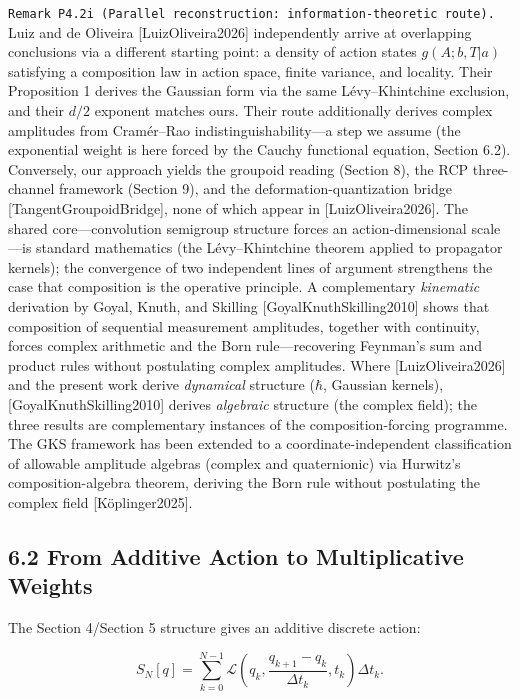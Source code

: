 \documentclass[
]{article}
\begin{document}
\texttt{Remark\ P4.2i\ (Parallel\ reconstruction:\ information-theoretic\ route).}
Luiz and de Oliveira {[}LuizOliveira2026{]} independently arrive at
overlapping conclusions via a different starting point: a density of
action states \(g(A;b,T|a)\) satisfying a composition law in action
space, finite variance, and locality. Their Proposition 1 derives the
Gaussian form via the same Lévy--Khintchine exclusion, and their \(d/2\)
exponent matches ours. Their route additionally derives complex
amplitudes from Cramér--Rao indistinguishability---a step we assume (the
exponential weight is here forced by the Cauchy functional equation,
Section 6.2). Conversely, our approach yields the groupoid reading
(Section 8), the RCP three-channel framework (Section 9), and the
deformation-quantization bridge {[}TangentGroupoidBridge{]}, none of
which appear in {[}LuizOliveira2026{]}. The shared core---convolution
semigroup structure forces an action-dimensional scale---is standard
mathematics (the Lévy--Khintchine theorem applied to propagator
kernels); the convergence of two independent lines of argument
strengthens the case that composition is the operative principle. A
complementary \emph{kinematic} derivation by Goyal, Knuth, and Skilling
{[}GoyalKnuthSkilling2010{]} shows that composition of sequential
measurement amplitudes, together with continuity, forces complex
arithmetic and the Born rule---recovering Feynman's sum and product
rules without postulating complex amplitudes. Where
{[}LuizOliveira2026{]} and the present work derive \emph{dynamical}
structure (\(\hbar\), Gaussian kernels), {[}GoyalKnuthSkilling2010{]}
derives \emph{algebraic} structure (the complex field); the three
results are complementary instances of the composition-forcing
programme. The GKS framework has been extended to a
coordinate-independent classification of allowable amplitude algebras
(complex and quaternionic) via Hurwitz's composition-algebra theorem,
deriving the Born rule without postulating the complex field
{[}Köplinger2025{]}.

\hypertarget{from-additive-action-to-multiplicative-weights}{%
\subsection{6.2 From Additive Action to Multiplicative
Weights}\label{from-additive-action-to-multiplicative-weights}}

The Section 4/Section 5 structure gives an additive discrete action:

\[
S_N[q]=\sum_{k=0}^{N-1}\mathcal L\!\left(q_k,\frac{q_{k+1}-q_k}{\Delta t_k},t_k\right)\Delta t_k.
\]
\end{document}
